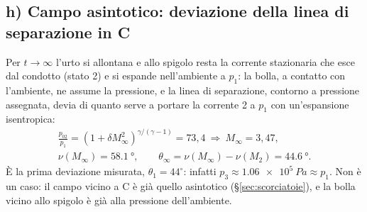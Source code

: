 \documentclass[11pt,a4paper]{article}
\begin{document}
\subsection*{h) Campo asintotico: deviazione della linea di separazione in C}
Per $t\to\infty$ l'urto si allontana e allo spigolo resta la corrente stazionaria che esce dal condotto (stato 2) e si
espande nell'ambiente a $p_1$: la bolla, a contatto con l'ambiente, ne assume la pressione, e la linea di separazione,
contorno a pressione assegnata, devia di quanto serve a portare la corrente 2 a $p_1$ con un'espansione isentropica:
\begin{gather*}
  \frac{p_{02}}{p_1}=(1+\delta M_\infty^2)^{\gamma/(\gamma-1)}=73{,}4\ \Rightarrow\ M_\infty=3{,}47,\\
  \nu(M_\infty)=\SI{58.1}{\degree},\qquad \theta_\infty=\nu(M_\infty)-\nu(M_2)=\SI{44.6}{\degree}.
\end{gather*}
È la prima deviazione misurata, $\theta_1=44^\circ$: infatti $p_3\approx\SI{1.06e5}{Pa}\approx p_1$. Non è un caso:
il campo vicino a C è già quello asintotico (§\ref{sec:scorciatoie}), e la bolla vicino allo spigolo è già alla
pressione dell'ambiente.

\end{document}
